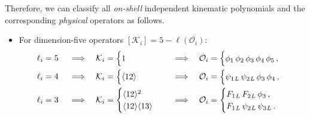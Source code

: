 Therefore, we can classify all \emph{on-shell} independent kinematic polynomials and the corresponding \emph{physical} operators as follows.
\begin{itemize}
    \item For dimension-five operators $[\mathcal K_i] = 5 - \ell(\mathcal O_i)$:
    \begin{align}
        \ell_i &= 5
        &&
        \implies 
        &
        \mathcal K_i &=
        \begin{cases}
            1
        \end{cases} 
        &&
        \implies 
        &
        \mathcal O_i &=
        \begin{cases}
            \phi_1\, \phi_2\, \phi_3\, \phi_4\, \phi_5\,,
        \end{cases}
        \\
        \ell_i &= 4 
        &&
        \implies
        &
        \mathcal K_i &= 
        \begin{cases}
             \langle 1 2 \rangle
        \end{cases}
        &&
        \implies 
        &
        \mathcal O_i &=
        \begin{cases}
            \psi_1{}_L\,  \psi_2{}_L\,  \phi_3\,  \phi_4  \,,
        \end{cases}
        \\
        \ell_i &= 3 
        &&
        \implies
        &
        \mathcal K_i &=
        \begin{cases}
            \langle 1 2 \rangle^2 \\
            \langle 1 2 \rangle\langle 1 3 \rangle
        \end{cases}
        &&
        \implies 
        &
        \mathcal O_i &= 
        \begin{cases}
            F_1{}_L\,  F_2{}_L\,  \phi_3\,, \\
            F_1{}_L\,  \psi_2{}_L\,  \psi_3{}_L \,.
        \end{cases}
    \end{align}
    

\end{itemize}
